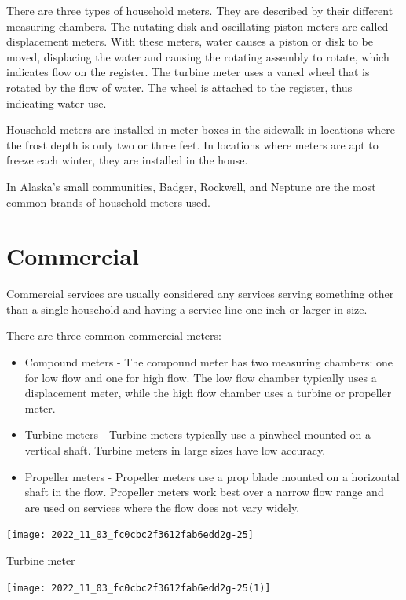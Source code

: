 \documentclass[10pt]{article}
\begin{document}
There are three types of household meters. They are described by their different measuring chambers. The nutating disk and oscillating piston meters are called displacement meters. With these meters, water causes a piston or disk to be moved, displacing the water and causing the rotating assembly to rotate, which indicates flow on the register. The turbine meter uses a vaned wheel that is rotated by the flow of water. The wheel is attached to the register, thus indicating water use.

Household meters are installed in meter boxes in the sidewalk in locations where the frost depth is only two or three feet. In locations where meters are apt to freeze each winter, they are installed in the house.

In Alaska's small communities, Badger, Rockwell, and Neptune are the most common brands of household meters used.

\section{Commercial}
Commercial services are usually considered any services serving something other than a single household and having a service line one inch or larger in size.

There are three common commercial meters:

\begin{itemize}
  \item Compound meters - The compound meter has two measuring chambers: one for low flow and one for high flow. The low flow chamber typically uses a displacement meter, while the high flow chamber uses a turbine or propeller meter.

  \item Turbine meters - Turbine meters typically use a pinwheel mounted on a vertical shaft. Turbine meters in large sizes have low accuracy.

  \item Propeller meters - Propeller meters use a prop blade mounted on a horizontal shaft in the flow. Propeller meters work best over a narrow flow range and are used on services where the flow does not vary widely.

\end{itemize}
\texttt{[image: 2022\_11\_03\_fc0cbc2f3612fab6edd2g-25]}

Turbine meter

\texttt{[image: 2022\_11\_03\_fc0cbc2f3612fab6edd2g-25(1)]}
\end{document}
